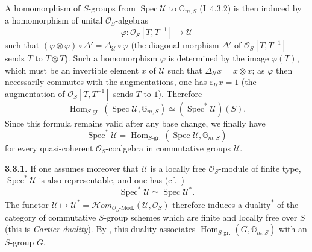 A homomorphism of \(S\)-groups from \(\operatorname{Spec}\mathcal U\) to
\(\mathbb G_{m,S}\) (I~4.3.2) is then induced by a homomorphism of unital
\(\mathcal O_S\)-algebras
\[
  \varphi:\mathcal O_S[T,T^{-1}]\longrightarrow\mathcal U
\]
such that \((\varphi\otimes\varphi)\circ\Delta'=\Delta_{\mathcal U}\circ\varphi\)
(the diagonal morphism \(\Delta'\) of \(\mathcal O_S[T,T^{-1}]\) sends
\(T\) to \(T\otimes T\)). Such a homomorphism \(\varphi\) is determined by
the image \(\varphi(T)\), which must be an invertible element \(x\) of
\(\mathcal U\) such that \(\Delta_{\mathcal U}x=x\otimes x\); as
\(\varphi\) then necessarily commutes with the augmentations, one has
\(\varepsilon_{\mathcal U}x=1\) (the augmentation of
\(\mathcal O_S[T,T^{-1}]\) sends \(T\) to \(1\)). Therefore
\[
  \operatorname{Hom}_{S\text{-gr.}}
  (\operatorname{Spec}\mathcal U,\mathbb G_{m,S})
  \simeq
  (\operatorname{Spec}^{*}\mathcal U)(S).
\]
Since this formula remains valid after any base change, we finally have
\[
  \operatorname{Spec}^{*}\mathcal U
  =
  \operatorname{Hom}_{S\text{-gr.}}
  (\operatorname{Spec}\mathcal U,\mathbb G_{m,S})
\]
for every quasi-coherent \(\mathcal O_S\)-coalgebra in commutative groups
\(\mathcal U\).

\medskip
\noindent\textbf{3.3.1.}
\label{sga3:VIIA:3.3.1}
If one assumes moreover that \(\mathcal U\) is a locally free
\(\mathcal O_S\)-module of finite type, \(\operatorname{Spec}^{*}\mathcal U\)
is also representable, and one has (cf.~)
\[
  \operatorname{Spec}^{*}\mathcal U\simeq\operatorname{Spec}\mathcal U^{*}.
\]
The functor
\(\mathcal U\mapsto\mathcal U^{*}
=\mathcal Hom_{\mathcal O_S\text{-Mod.}}(\mathcal U,\mathcal O_S)\)
therefore induces a duality\textsuperscript{\(\ast\)} of the category of
commutative \(S\)-group schemes which are finite and locally free over
\(S\) (this is \emph{Cartier duality}). By , this duality associates
\(\operatorname{Hom}_{S\text{-gr.}}(G,\mathbb G_{m,S})\) with an
\(S\)-group \(G\).

\begingroup
\renewcommand{\thefootnote}{\fnsymbol{footnote}}
\endgroup

